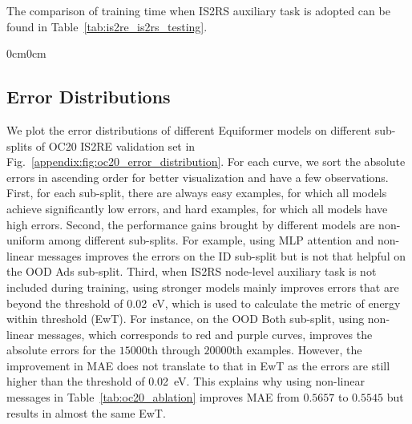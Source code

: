 The comparison of training time when IS2RS auxiliary task is adopted can be found in Table~\ref{tab:is2re_is2rs_testing}.


\begin{table}[t]
\begin{adjustwidth}{0cm}{0cm}
\centering
{}
\vspace{-2mm}
\end{adjustwidth}
\caption{\textbf{Comparison of training time and numbers of parameters for OC20 dataset.}  
}
\label{appendix:tab:oc20_training_time}
\end{table}

\subsection{Error Distributions}
\label{appendix:subsec:error_distributions}
We plot the error distributions of different Equiformer models on different sub-splits of OC20 IS2RE validation set in Fig.~\ref{appendix:fig:oc20_error_distribution}.
For each curve, we sort the absolute errors in ascending order for better visualization and have a few observations.
First, for each sub-split, there are always easy examples, for which all models achieve significantly low errors, and hard examples, for which all models have high errors.
Second, the performance gains brought by different models are non-uniform among different sub-splits.
For example, using MLP attention and non-linear messages improves the errors on the ID sub-split but is not that helpful on the OOD Ads sub-split.
Third, when IS2RS node-level auxiliary task is not included during training, using stronger models mainly improves errors that are beyond the threshold of 0.02~eV, which is used to calculate the metric of energy within threshold (EwT).
For instance, on the OOD Both sub-split, using non-linear messages, which corresponds to red and purple curves, improves the absolute errors for the $15000$th through $20000$th examples.
However, the improvement in MAE does not translate to that in EwT as the errors are still higher than the threshold of 0.02~eV.
This explains why using non-linear messages in Table~\ref{tab:oc20_ablation} improves MAE from $0.5657$ to $0.5545$ but results in almost the same EwT.


